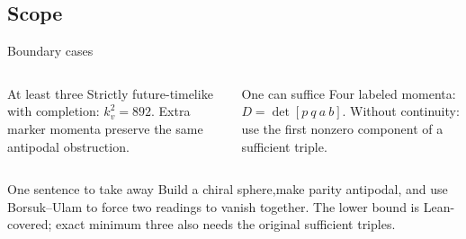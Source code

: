 \documentclass{beamer}
\begin{document}
\subsection{Scope}
\begin{frame}{Boundary cases}
  \begin{columns}
      \begin{block}{At least three}
        Strictly future-timelike with completion: $k_v^2=892$. Extra marker momenta preserve the same antipodal obstruction.
      \end{block}
      \begin{block}{One can suffice}
        Four labeled momenta: $D=\det[p\ q\ a\ b]$. Without continuity: use the first nonzero component of a sufficient triple.
      \end{block}
  \end{columns}
\end{frame}
\begin{frame}{One sentence to take away}
  \centering
  \Large
  Build a chiral sphere,\quad make parity antipodal,\quad
  and use Borsuk--Ulam to force two readings to vanish together.
  \vfill
  \small
  The lower bound is Lean-covered; exact minimum three also needs the original sufficient triples.
\end{frame}
\appendix
\FormalVerification
\end{document}
